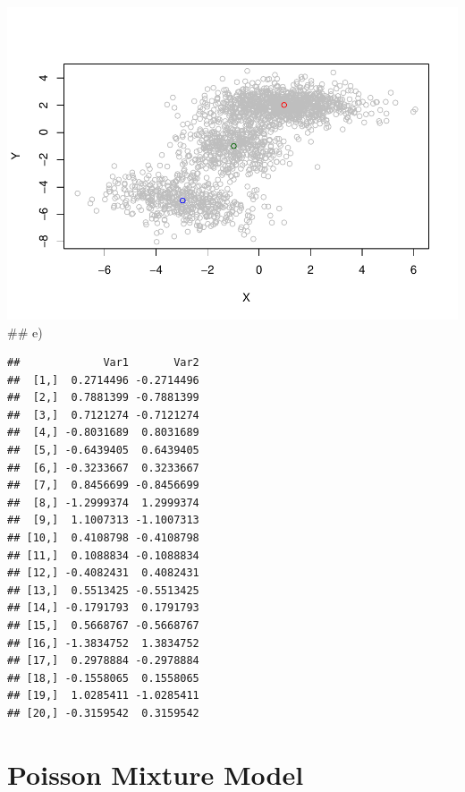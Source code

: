 \documentclass[
]{article}
\newenvironment{Shaded}{\begin{snugshade}}{\end{snugshade}}
\newcommand{\CommentTok}[1]{\textcolor[rgb]{0.56,0.35,0.01}{\textit{#1}}}
\newcommand{\DecValTok}[1]{\textcolor[rgb]{0.00,0.00,0.81}{#1}}
\newcommand{\FunctionTok}[1]{\textcolor[rgb]{0.00,0.00,0.00}{#1}}
\newcommand{\NormalTok}[1]{#1}
\newcommand{\OtherTok}[1]{\textcolor[rgb]{0.56,0.35,0.01}{#1}}
\newcommand{\SpecialCharTok}[1]{\textcolor[rgb]{0.00,0.00,0.00}{#1}}
\begin{document}
\includegraphics{539-hw3_files/figure-latex/unnamed-chunk-11-1.pdf} \#\#
e)

\begin{Shaded}
\end{Shaded}

\begin{verbatim}
##             Var1       Var2
##  [1,]  0.2714496 -0.2714496
##  [2,]  0.7881399 -0.7881399
##  [3,]  0.7121274 -0.7121274
##  [4,] -0.8031689  0.8031689
##  [5,] -0.6439405  0.6439405
##  [6,] -0.3233667  0.3233667
##  [7,]  0.8456699 -0.8456699
##  [8,] -1.2999374  1.2999374
##  [9,]  1.1007313 -1.1007313
## [10,]  0.4108798 -0.4108798
## [11,]  0.1088834 -0.1088834
## [12,] -0.4082431  0.4082431
## [13,]  0.5513425 -0.5513425
## [14,] -0.1791793  0.1791793
## [15,]  0.5668767 -0.5668767
## [16,] -1.3834752  1.3834752
## [17,]  0.2978884 -0.2978884
## [18,] -0.1558065  0.1558065
## [19,]  1.0285411 -1.0285411
## [20,] -0.3159542  0.3159542
\end{verbatim}

\hypertarget{poisson-mixture-model}{%
\section{Poisson Mixture Model}\label{poisson-mixture-model}}
\end{document}
